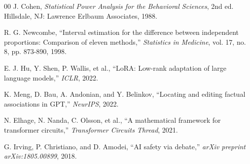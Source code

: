 \documentclass[compsoc,conference,a4paper,10pt,times]{IEEEtran}
\begin{document}
\begin{thebibliography}{00}
 J. Cohen, \emph{Statistical Power Analysis for the Behavioral Sciences}, 2nd ed. Hillsdale, NJ: Lawrence Erlbaum Associates, 1988.

 R. G. Newcombe, ``Interval estimation for the difference between independent proportions: Comparison of eleven methods,'' \emph{Statistics in Medicine}, vol. 17, no. 8, pp. 873-890, 1998.

 E. J. Hu, Y. Shen, P. Wallis, et al., ``LoRA: Low-rank adaptation of large language models,'' \emph{ICLR}, 2022.

 K. Meng, D. Bau, A. Andonian, and Y. Belinkov, ``Locating and editing factual associations in GPT,'' \emph{NeurIPS}, 2022.

 N. Elhage, N. Nanda, C. Olsson, et al., ``A mathematical framework for transformer circuits,'' \emph{Transformer Circuits Thread}, 2021.

 G. Irving, P. Christiano, and D. Amodei, ``AI safety via debate,'' \emph{arXiv preprint arXiv:1805.00899}, 2018.

\end{thebibliography}
\end{document}
